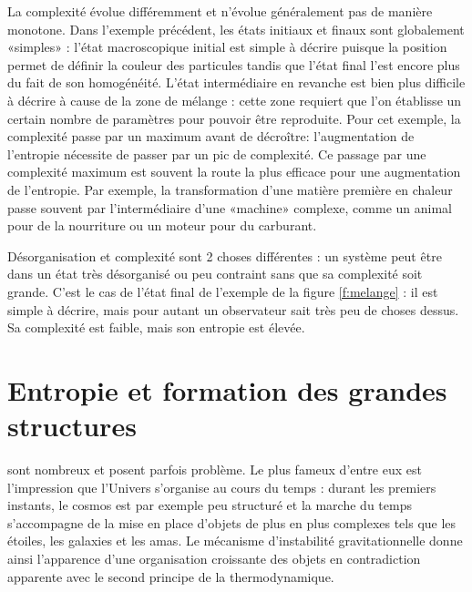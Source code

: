 La complexité évolue différemment et n'évolue généralement pas de manière monotone. Dans l'exemple précédent, les états initiaux et finaux sont globalement «simples» : l'état macroscopique initial est simple à décrire puisque la position permet de définir la couleur des particules tandis que l'état final l'est encore plus du fait de son homogénéité. L'état intermédiaire en revanche est bien plus difficile à décrire à cause de la zone de mélange : cette zone requiert que l'on établisse un certain nombre de paramètres pour pouvoir être reproduite. Pour cet exemple, la complexité passe par un maximum avant de décroître: l'augmentation de l'entropie nécessite de passer par un pic de complexité. Ce passage par une complexité maximum est souvent la route la plus efficace pour une augmentation de l'entropie. Par exemple, la transformation d'une matière première en chaleur passe souvent par l'intermédiaire d'une «machine» complexe, comme un animal pour de la nourriture ou un moteur pour du carburant.

{Désorganisation et complexité} sont 2 choses différentes : un système peut être dans un état très désorganisé ou peu contraint sans que sa complexité soit grande. C'est le cas de l'état final de l'exemple de la figure \ref{f:melange} : il est simple à décrire, mais pour autant un observateur sait très peu de choses dessus. Sa complexité est faible, mais son entropie est élevée. 

\section{Entropie et formation des grandes structures}
 sont nombreux et posent parfois problème. Le plus fameux d'entre eux est l'impression que l'Univers s'organise au cours du temps : durant les premiers instants, le cosmos est par exemple peu structuré et la marche du temps s'accompagne de la mise en place d'objets de plus en plus complexes tels que les étoiles, les galaxies et les amas. Le mécanisme d'instabilité gravitationnelle donne ainsi l'apparence d'une organisation croissante des objets en contradiction apparente avec le second principe de la thermodynamique. 

